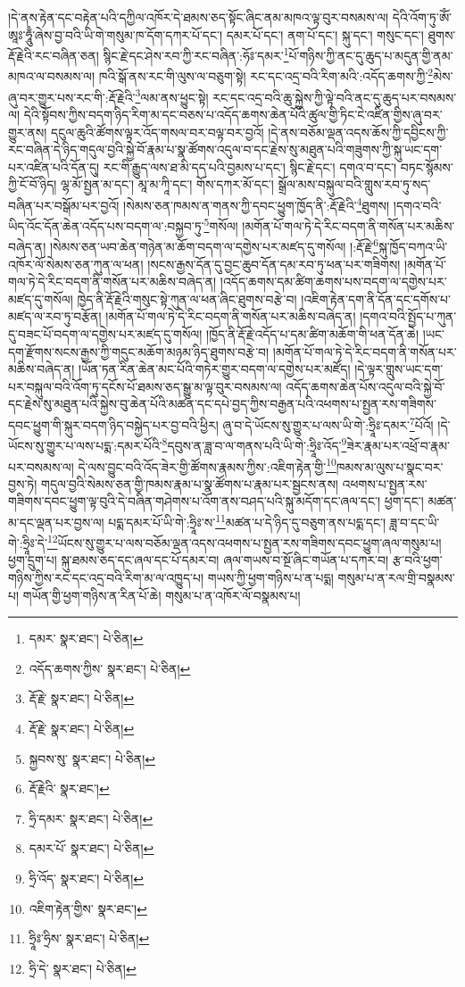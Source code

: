 །དེ་ནས་རྟེན་དང་བརྟེན་པའི་དཀྱིལ་འཁོར་དེ་ཐམས་ཅད་སྟོང་ཞིང་ནམ་མཁའ་ལྟ་བུར་བསམས་ལ། དེའི་འོག་ཏུ་ཨོཾ་ཨཱཿ་ཧཱུྃ་ཞེས་བྱ་བའི་ཡི་གེ་གསུམ་ཁ་དོག་དཀར་པོ་དང་། དམར་པོ་དང་། ནག་པོ་དང་། སྐུ་དང་། གསུང་དང་། ཐུགས་རྡོ་རྗེའི་རང་བཞིན་ཅན། སྙིང་རྗེ་དང་ཤེས་རབ་ཀྱི་རང་བཞིན་:ཧོཿ་དམར་\footnote{དམར་  སྣར་ཐང་།  པེ་ཅིན། }པོ་གཉིས་ཀྱི་ནང་དུ་ཆུད་པ་མདུན་གྱི་ནམ་མཁའ་ལ་བསམས་ལ། ཁའི་སྒོ་ནས་རང་གི་ལུས་ལ་བཅུག་སྟེ། རང་དང་འདྲ་བའི་རིག་མའི་:འདོད་ཆགས་ཀྱི་\footnote{འདོད་ཆགས་ཀྱིས་  སྣར་ཐང་།  པེ་ཅིན། }མེས་ཞུ་བར་གྱུར་པས་རང་གི་:རྡོ་རྗེའི་\footnote{རྡོ་རྗེ་  སྣར་ཐང་།  པེ་ཅིན། }ལམ་ནས་ཕྱུང་སྟེ། རང་དང་འདྲ་བའི་ཆུ་སྐྱེས་ཀྱི་ལྟེ་བའི་ནང་དུ་ཆུད་པར་བསམས་ལ། དེའི་སྟོབས་ཀྱིས་བདག་ཉིད་རིག་མ་དང་བཅས་པ་འདོད་ཆགས་ཆེན་པོའི་ཚུལ་གྱི་ཏིང་ངེ་འཛིན་གྱིས་ཞུ་བར་གྱུར་ནས། དངུལ་ཆུའི་ཚོགས་ལྟར་འོད་གསལ་བར་བལྟ་བར་བྱའོ། །དེ་ནས་བཅོམ་ལྡན་འདས་ཆོས་ཀྱི་དབྱིངས་ཀྱི་རང་བཞིན་དེ་ཉིད་གདུལ་བྱའི་སྐྱེ་བོ་རྣམ་པ་སྣ་ཚོགས་འདུལ་བ་དང་རྗེས་སུ་མཐུན་པའི་གཟུགས་ཀྱི་སྐུ་ཡང་དག་པར་འཛིན་པའི་དོན་དུ། རང་གི་རྒྱུད་ལས་ཐ་མི་དད་པའི་བྱམས་པ་དང་། སྙིང་རྗེ་དང་། དགའ་བ་དང་། བཏང་སྙོམས་ཀྱི་ངོ་བོ་ཉིད། ལྷ་མོ་སྤྱན་མ་དང་། མཱ་མ་ཀཱི་དང་། གོས་དཀར་མོ་དང་། སྒྲོལ་མས་བསྐུལ་བའི་གླུས་རབ་ཏུ་སད་བཞིན་པར་བསྒོམ་པར་བྱའོ། །སེམས་ཅན་ཁམས་ན་གནས་ཀྱི་དབང་ཕྱུག་ཁྱོད་ནི་:རྡོ་རྗེའི་\footnote{རྡོ་རྗེ་  སྣར་ཐང་།  པེ་ཅིན། }ཐུགས། །དགའ་བའི་ཡིད་འོང་དོན་ཆེན་འདོད་པས་བདག་ལ་:བསྐྱབ་ཏུ་\footnote{སྐྱབས་སུ་  སྣར་ཐང་།  པེ་ཅིན། }གསོལ། །མགོན་པོ་གལ་ཏེ་དེ་རིང་བདག་ནི་གསོན་པར་མཆིས་བཞེད་ན། །སེམས་ཅན་ཡབ་ཆེན་གཉེན་མ་ཆོག་བདག་ལ་དགྱེས་པར་མཛད་དུ་གསོལ། །:རྡོ་རྗེ་\footnote{རྡོ་རྗེའི་  སྣར་ཐང་། }སྐུ་ཁྱོད་བཀའ་ཡི་འཁོར་ལོ་སེམས་ཅན་ཀུན་ལ་ཕན། །སངས་རྒྱས་དོན་དུ་བྱང་ཆུབ་དོན་དམ་རབ་ཏུ་ཕན་པར་གཟིགས། །མགོན་པོ་གལ་ཏེ་དེ་རིང་བདག་ནི་གསོན་པར་མཆིས་བཞེད་ན། །འདོད་ཆགས་དམ་ཚིག་ཆགས་པས་བདག་ལ་དགྱེས་པར་མཛད་དུ་གསོལ། ཁྱེད་ནི་རྡོ་རྗེའི་གསུང་སྟེ་ཀུན་ལ་ཕན་ཞིང་ཐུགས་བརྩེ་བ། །འཇིག་རྟེན་དག་ནི་དོན་དང་དགོས་པ་མཛད་ལ་རབ་ཏུ་བརྩོན། །མགོན་པོ་གལ་ཏེ་དེ་རིང་བདག་ནི་གསོན་པར་མཆིས་བཞེད་ན། །དགའ་བའི་སྤྱོད་པ་ཀུན་དུ་བཟང་པོ་བདག་ལ་དགྱེས་པར་མཛད་དུ་གསོལ། །ཁྱོད་ནི་རྡོ་རྗེ་འདོད་པ་དམ་ཚིག་མཆོག་གི་ཕན་དོན་ཆེ། །ཡང་དག་རྫོགས་སངས་རྒྱས་ཀྱི་གདུང་མཆོག་མཉམ་ཉིད་ཐུགས་བརྩེ་བ། །མགོན་པོ་གལ་ཏེ་དེ་རིང་བདག་ནི་གསོན་པར་མཆིས་བཞེད་ན། །ཡོན་ཏན་རིན་ཆེན་མང་པོའི་གཏེར་གྱུར་བདག་ལ་དགྱེས་པར་མཛོད། །དེ་ལྟར་གླུས་ཡང་དག་པར་བསྐུལ་བའི་འོག་ཏུ་དངོས་པོ་ཐམས་ཅད་སྒྱུ་མ་ལྟ་བུར་བསམས་ལ། འདོད་ཆགས་ཆེན་པོས་འདུལ་བའི་སྐྱེ་བོ་དང་རྗེས་སུ་མཐུན་པའི་སྐྱེས་བུ་ཆེན་པོའི་མཚན་དང་དཔེ་བྱད་ཀྱིས་བརྒྱན་པའི་འཕགས་པ་སྤྱན་རས་གཟིགས་དབང་ཕྱུག་གི་སྐུར་བདག་ཉིད་བསྐྱེད་པར་བྱ་བའི་ཕྱིར། ཞུ་བ་དེ་ཡོངས་སུ་གྱུར་པ་ལས་ཡི་གེ་:ཧྲཱིཿ་དམར་\footnote{ཧྲི་དམར་  སྣར་ཐང་།  པེ་ཅིན། }པོའོ། །དེ་ཡོངས་སུ་གྱུར་པ་ལས་པདྨ་:དམར་པོའི་\footnote{དམར་པོ་  སྣར་ཐང་།  པེ་ཅིན། }དབུས་ན་ཟླ་བ་ལ་གནས་པའི་ཡི་གེ་:ཧྲཱིཿ་འོད་\footnote{ཧྲི་འོད་  སྣར་ཐང་།  པེ་ཅིན། }ཟེར་རྣམ་པར་འཕྲོ་བ་རྣམ་པར་བསམས་ལ། དེ་ལས་བྱུང་བའི་འོད་ཟེར་གྱི་ཚོགས་རྣམས་ཀྱིས་:འཇིག་རྟེན་གྱི་\footnote{འཇིག་རྟེན་གྱིས་  སྣར་ཐང་། }ཁམས་མ་ལུས་པ་སྣང་བར་བྱས་ཏེ། གདུལ་བྱའི་སེམས་ཅན་གྱི་ཁམས་རྣམ་པ་སྣ་ཚོགས་པ་རྣམ་པར་སྦྱངས་ནས། འཕགས་པ་སྤྱན་རས་གཟིགས་དབང་ཕྱུག་ལྟ་བུའི་དེ་བཞིན་གཤེགས་པ་འོག་ནས་བཤད་པའི་སྐུ་མདོག་དང་ཞལ་དང་། ཕྱག་དང་། མཚན་མ་དང་ལྡན་པར་བྱས་ལ། པདྨ་དམར་པོ་ཡི་གེ་:ཧྲཱིཿ་ས་\footnote{ཧྲཱིཿ་ཧྲིས་  སྣར་ཐང་།  པེ་ཅིན། }མཚན་པ་དེ་ཉིད་དུ་བཅུག་ནས་པདྨ་དང་། ཟླ་བ་དང་ཡི་གེ་:ཧྲཱིཿ་དེ་\footnote{ཧྲི་དེ་  སྣར་ཐང་།  པེ་ཅིན། }ཡོངས་སུ་གྱུར་པ་ལས་བཅོམ་ལྡན་འདས་འཕགས་པ་སྤྱན་རས་གཟིགས་དབང་ཕྱུག་ཞལ་གསུམ་པ། ཕྱག་དྲུག་པ། སྐུ་ཐམས་ཅད་དང་ཞལ་དང་པོ་དམར་བ། ཞལ་གཡས་བ་སྔོ་ཞིང་གཡོན་པ་དཀར་བ། རྩ་བའི་ཕྱག་གཉིས་ཀྱིས་རང་དང་འདྲ་བའི་རིག་མ་ལ་འཁྱུད་པ། གཡས་ཀྱི་ཕྱག་གཉིས་པ་ན་པདྨ། གསུམ་པ་ན་རལ་གྲི་བསྣམས་པ། གཡོན་གྱི་ཕྱག་གཉིས་ན་རིན་པོ་ཆེ། གསུམ་པ་ན་འཁོར་ལོ་བསྣམས་པ། 
